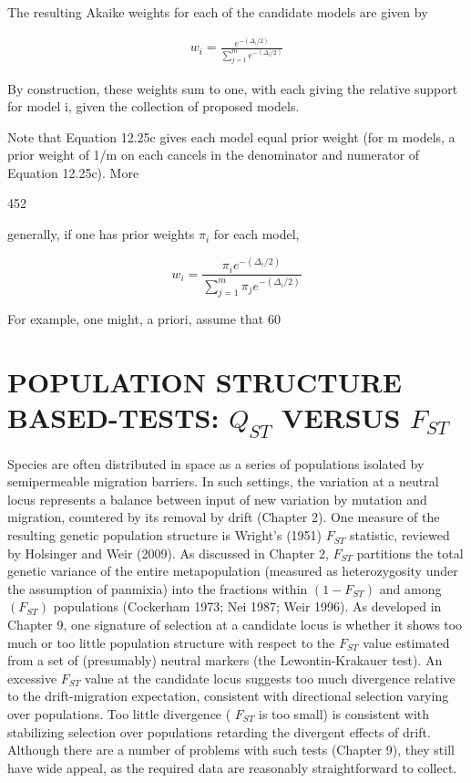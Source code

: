 \documentclass{article}
\begin{document}
The resulting Akaike weights for each of the candidate models are given by

\begin{equation}
\begin{align*}w_i=\frac{e^{-(\Delta_i/2)}}{\sum_{j=1}^m e^{-(\Delta_i/2)}}\end{align*}
\tag{12.25c}
\label{eq:12_25c}
\end{equation}

By construction, these weights sum to one, with each giving the relative support for model i, given the collection of proposed models.

Note that Equation 12.25c gives each model equal prior weight (for m models, a prior weight of 1/m on each cancels in the denominator and numerator of Equation 12.25c). More

452

generally, if one has prior weights  $ \pi_{i} $ for each model,

\begin{equation}
w_{i}=\frac{\pi_{i}e^{-(\Delta_{i}/2)}}{\sum_{j=1}^{m}\pi_{j}e^{-(\Delta_{i}/2)}}
\tag{12.25d}
\label{eq:12_25d}
\end{equation}

For example, one might, a priori, assume that 60%

\section{POPULATION STRUCTURE BASED-TESTS:  $ Q_{ST} $ VERSUS  $ F_{ST} $}
Species are often distributed in space as a series of populations isolated by semipermeable migration barriers. In such settings, the variation at a neutral locus represents a balance between input of new variation by mutation and migration, countered by its removal by drift (Chapter 2). One measure of the resulting genetic population structure is Wright's (1951)  $ F_{ST} $ statistic, reviewed by Holsinger and Weir (2009). As discussed in Chapter 2,  $ F_{ST} $ partitions the total genetic variance of the entire metapopulation (measured as heterozygosity under the assumption of panmixia) into the fractions within  $ (1 - F_{ST}) $ and among  $ (F_{ST}) $ populations (Cockerham 1973; Nei 1987; Weir 1996). As developed in Chapter 9, one signature of selection at a candidate locus is whether it shows too much or too little population structure with respect to the  $ F_{ST} $ value estimated from a set of (presumably) neutral markers (the Lewontin-Krakauer test). An excessive  $ F_{ST} $ value at the candidate locus suggests too much divergence relative to the drift-migration expectation, consistent with directional selection varying over populations. Too little divergence ( $ F_{ST} $ is too small) is consistent with stabilizing selection over populations retarding the divergent effects of drift. Although there are a number of problems with such tests (Chapter 9), they still have wide appeal, as the required data are reasonably straightforward to collect.
\end{document}
